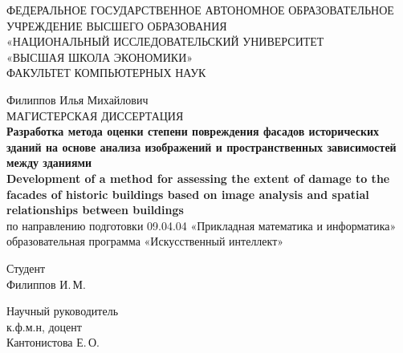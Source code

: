 \documentclass[14pt]{extarticle}
\begin{document}
\begin{titlepage}
    \thispagestyle{empty}
    \begin{center}
        {\normalsize ФЕДЕРАЛЬНОЕ ГОСУДАРСТВЕННОЕ АВТОНОМНОЕ ОБРАЗОВАТЕЛЬНОЕ УЧРЕЖДЕНИЕ ВЫСШЕГО ОБРАЗОВАНИЯ}\\        
        {\normalsize «НАЦИОНАЛЬНЫЙ ИССЛЕДОВАТЕЛЬСКИЙ УНИВЕРСИТЕТ\\
        «ВЫСШАЯ ШКОЛА ЭКОНОМИКИ»}\\        
        {\normalsize ФАКУЛЬТЕТ КОМПЬЮТЕРНЫХ НАУК}\\
        \vspace{1.2cm}

        {\normalsize Филиппов Илья Михайлович}\\
        \vspace{0.8cm}
        {\normalsize МАГИСТЕРСКАЯ ДИССЕРТАЦИЯ}\\
        {\normalsize\textbf{Разработка метода оценки степени повреждения фасадов исторических
        зданий на основе анализа изображений и пространственных зависимостей между зданиями}}\\
        \vspace{0.4cm}
        {\normalsize\textbf{Development of a method for assessing the extent of damage to the facades of historic buildings based on image analysis and spatial relationships between buildings}}\\
        \vspace{0.4cm}
        {\normalsize по направлению подготовки 09.04.04 «Прикладная математика и информатика»}\\
        {\normalsize образовательная программа «Искусственный интеллект»}\\
    \end{center}

    \vspace{1.6cm}
    
    \begin{minipage}{0.45\textwidth}
    	\begin{flushleft}
    		{\normalsize Студент}\\    		
    		{\normalsize Филиппов И.\,М.}\\
    	\end{flushleft}
    \end{minipage}

	\vspace{0.6cm}
    \hfill
    \begin{minipage}{0.45\textwidth}
        \begin{flushleft}
            {\normalsize Научный руководитель}\\
            {\normalsize к.ф.м.н, доцент}\\
            {\normalsize Кантонистова Е.\,О.}\\
        \end{flushleft}
    \end{minipage}


\end{titlepage}
\end{document}
